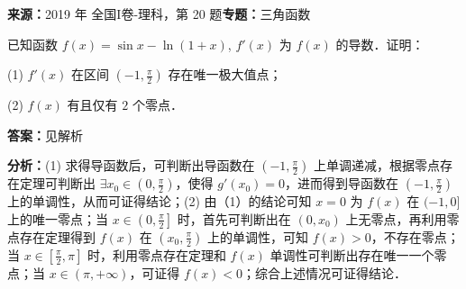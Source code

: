 \begin{question}[points=12]
\textbf{来源：}2019 年 全国I卷-理科，第 20 题\quad \textbf{专题：}三角函数\par
已知函数 $f(x) = \sin x - \ln(1 + x)$, $f'(x)$ 为 $f(x)$ 的导数．证明：

(1) $f'(x)$ 在区间 $\left(-1, \frac{\pi}{2}\right)$ 存在唯一极大值点；

(2) $f(x)$ 有且仅有 $2$ 个零点．
\begin{solution}
\textbf{答案：}见解析

\textbf{分析：}(1) 求得导函数后，可判断出导函数在 $\left(-1, \frac{\pi}{2}\right)$ 上单调递减，根据零点存在定理可判断出 $\exists x_0 \in \left(0, \frac{\pi}{2}\right)$，使得 $g'(x_0) = 0$，进而得到导函数在 $\left(-1, \frac{\pi}{2}\right)$ 上的单调性，从而可证得结论；(2) 由（1）的结论可知 $x = 0$ 为 $f(x)$ 在 $(-1, 0]$ 上的唯一零点；当 $x \in \left(0, \frac{\pi}{2}\right]$ 时，首先可判断出在 $(0, x_0)$ 上无零点，再利用零点存在定理得到 $f(x)$ 在 $\left(x_0, \frac{\pi}{2}\right)$ 上的单调性，可知 $f(x) > 0$，不存在零点；当 $x \in \left[\frac{\pi}{2}, \pi\right]$ 时，利用零点存在定理和 $f(x)$ 单调性可判断出存在唯一一个零点；当 $x \in (\pi, +\infty)$，可证得 $f(x) < 0$；综合上述情况可证得结论．


\end{solution}
\end{question}
